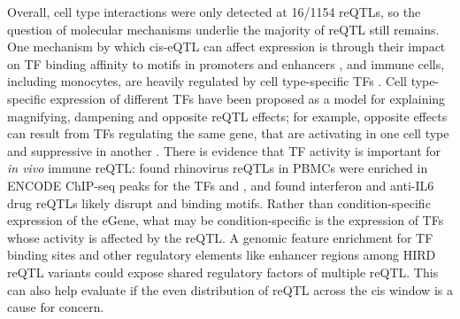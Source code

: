 Overall, cell type interactions were only detected at 16/1154 reQTLs,
so the question of molecular mechanisms underlie the majority of reQTL still remains.
One mechanism by which cis-eQTL can affect expression is through their impact on \gls{TF} binding affinity to motifs in promoters and enhancers \autocite{pai2015GeneticMechanisticBasis}, 
and immune cells, including monocytes, are heavily regulated by cell type-specific \glspl{TF} \autocite{choudhury2016IdentifyingCellTypeSpecific}.
Cell type-specific expression of different \glspl{TF} have been proposed as a model for explaining magnifying, dampening and opposite reQTL effects;
for example, opposite effects can result from \glspl{TF} regulating the same gene, that are activating in one cell type and suppressive in another \autocite{fu2012UnravelingRegulatoryMechanisms}.
There is evidence that \gls{TF} activity is important for \textit{in vivo} immune reQTL:
\autocite{caliskan2015HostGeneticVariation} found rhinovirus reQTLs in \glspl{PBMC} were enriched in ENCODE ChIP-seq peaks for the \glspl{TF}  and ,
and \autocite{davenport2018DiscoveringVivoCytokineeQTL} found interferon and anti-IL6 drug reQTLs likely disrupt  and  binding motifs.
Rather than condition-specific expression of the eGene, what may be condition-specific is the expression of \glspl{TF} whose activity is affected by the reQTL.
A genomic feature enrichment for TF binding sites and other regulatory elements like enhancer regions among HIRD reQTL variants could expose 
shared regulatory factors of multiple reQTL.
This can also help evaluate if the even distribution of reQTL across the cis window is a cause for concern.

%


